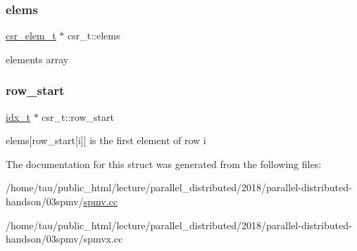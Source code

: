 \subsubsection{\texorpdfstring{elems}{elems}}
{\footnotesize\ttfamily \hyperlink{structcsr__elem__t}{csr\+\_\+elem\+\_\+t} $\ast$ csr\+\_\+t\+::elems}

elements array \mbox{\label{structcsr__t_ac7fedb71b649719de7dd835a06d90180}} 
\subsubsection{\texorpdfstring{row\+\_\+start}{row\_start}}
{\footnotesize\ttfamily \hyperlink{spmv_8cc_a8e93478a00e685bea5e6a3f617bf03a3}{idx\+\_\+t} $\ast$ csr\+\_\+t\+::row\+\_\+start}

elems\mbox{[}row\+\_\+start\mbox{[}i\mbox{]}\mbox{]} is the first element of row i 

The documentation for this struct was generated from the following files\+:\begin{DoxyCompactItemize}
\item 
/home/tau/public\+\_\+html/lecture/parallel\+\_\+distributed/2018/parallel-\/distributed-\/handson/03spmv/\hyperlink{spmv_8cc}{spmv.\+cc}\item 
/home/tau/public\+\_\+html/lecture/parallel\+\_\+distributed/2018/parallel-\/distributed-\/handson/03spmv/spmvx.\+cc\end{DoxyCompactItemize}
